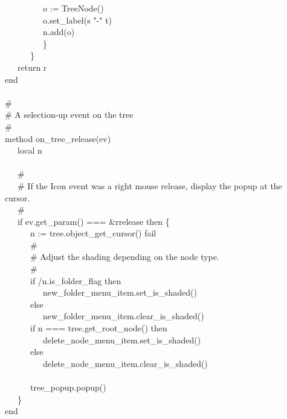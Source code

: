 {\>   \ \ \ \ \ \ \ \ \ o := TreeNode() \\
\>   \ \ \ \ \ \ \ \ \ o.set\_label(s {\textbar}{\textbar}
"-" {\textbar}{\textbar}t) \\
\>   \ \ \ \ \ \ \ \ \ n.add(o) \\
\>   \ \ \ \ \ \ \ \ \ \} \\
\>   \ \ \ \ \ \ \} \\
\>   \ \ \ return r \\
\>   end \\
\ \\
\>   \# \\
\>   \# A selection-up event on the tree \\
\>   \# \\
\>   method on\_tree\_release(ev) \\
\>   \ \ \ local n \\
\ \\
\>   \ \ \ \# \\
\>   \ \ \ \# If the Icon event was a right mouse release, display the popup at the cursor. \\
\>   \ \ \ \# \\
\>   \ \ \ if ev.get\_param() === \&rrelease then \{ \\
\>   \ \ \ \ \ \ n := tree.object\_get\_cursor() {\textbar} fail \\
\>   \ \ \ \ \ \ \# \\
\>   \ \ \ \ \ \ \# Adjust the shading depending on the node type. \\
\>   \ \ \ \ \ \ \# \\
\>   \ \ \ \ \ \ if /n.is\_folder\_flag then \\
\>   \ \ \ \ \ \ \ \ \ new\_folder\_menu\_item.set\_is\_shaded() \\
\>   \ \ \ \ \ \ else \\
\>   \ \ \ \ \ \ \ \ \ new\_folder\_menu\_item.clear\_is\_shaded() \\
\>   \ \ \ \ \ \ if n === tree.get\_root\_node() then \\
\>   \ \ \ \ \ \ \ \ \ delete\_node\_menu\_item.set\_is\_shaded() \\
\>   \ \ \ \ \ \ else \\
\>   \ \ \ \ \ \ \ \ \ delete\_node\_menu\_item.clear\_is\_shaded() \\
\ \\
\>   \ \ \ \ \ \ tree\_popup.popup() \\
\>   \ \ \ \} \\
\>   end \\
}
